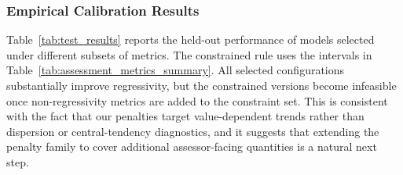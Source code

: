 \documentclass{article}
\theoremstyle{plain}
\theoremstyle{definition}
\newcommand{\1}{\mathbf{1}}
\begin{document}
\subsubsection{Empirical Calibration Results}

Table~\ref{tab:test_results} reports the held-out performance of models selected under different subsets of metrics. The constrained rule uses the intervals in Table~\ref{tab:assessment_metrics_summary}. All selected configurations substantially improve regressivity, but the constrained versions become infeasible once non-regressivity metrics are added to the constraint set. This is consistent with the fact that our penalties target value-dependent trends rather than dispersion or central-tendency diagnostics, and it suggests that extending the penalty family to cover additional assessor-facing quantities is a natural next step.
\end{document}
